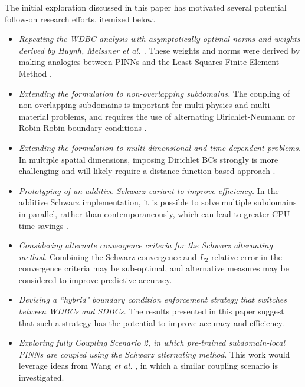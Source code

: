 \documentclass[oneside,final]{csri23}
\begin{document}
The initial exploration discussed in this paper has motivated several potential follow-on research efforts, itemized below.
 
\begin{itemize}
    \item \textit{Repeating the WDBC analysis with asymptotically-optimal norms and weights derived by Huynh, Meissner \textit{et al.} \cite{WDS:Meissner2023, WDS:Huynh2023}.} These weights and norms were derived by making analogies between PINNs and the Least Squares Finite Element Method \cite{WDS:LSFEMBook}.
    \item \textit{Extending the formulation to non-overlapping subdomains.}  The coupling of non-overlapping subdomains is important for multi-physics and multi-material problems, and requires the use of alternating Dirichlet-Neumann or Robin-Robin boundary conditions \cite{WDS:Gander2008, WDS:barnett2022schwarz}. 
    \item \textit{Extending the formulation to multi-dimensional and time-dependent problems.}  In multiple spatial dimensions, imposing Dirichlet BCs strongly is more challenging and will likely require a distance function-based approach \cite{WDS:Sukumar:2022, WDS:Wang:2022}.
    \item \textit{Prototyping of an additive Schwarz variant to improve efficiency.}  In the additive Schwarz implementation, it is possible to solve multiple subdomains in parallel, rather than contemporaneously, which can lead to greater CPU-time savings \cite{WDS:LiD3M, WDS:LiDeepDDM, WDS:Gander2008}.
    \item \textit{Considering alternate convergence criteria for the Schwarz alternating method.} Combining the Schwarz convergence and $L_2$ relative error in the convergence criteria may be sub-optimal, and alternative measures may be considered to improve predictive accuracy.
    \item \textit{Devising a ``hybrid" boundary condition enforcement strategy that switches between WDBCs and SDBCs.}  The results presented in this paper suggest that such a strategy has the potential to improve accuracy and efficiency.
    \item \textit{Exploring fully Coupling Scenario 2, in which pre-trained subdomain-local PINNs are coupled using the Schwarz alternating method.}  This work would leverage ideas from Wang \textit{et al.} \cite{WDS:Wang:2022}, in which a similar coupling scenario is investigated.
\end{itemize}
\end{document}
